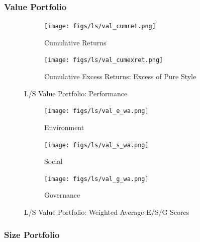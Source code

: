 \documentclass[11pt,a4paper]{article}
\begin{document}
\clearpage

\subsubsection{Value Portfolio}

\begin{figure}[h!]
    \centering
    \begin{subfigure}{.5\textwidth}
        \centering
        \texttt{[image: figs/ls/val\_cumret.png]}
        \caption{Cumulative Returns}
        \label{fig:val_cumret}
    \end{subfigure}%
    \begin{subfigure}{.5\textwidth}
      \centering
      \texttt{[image: figs/ls/val\_cumexret.png]}
      \caption{Cumulative Excess Returns: Excess of Pure Style}
      \label{fig:val_cumexret}
    \end{subfigure}
    \caption{L/S Value Portfolio: Performance}
\end{figure}

\begin{figure}[h!]
    \centering
    \begin{subfigure}{.33\textwidth}
        \centering
        \texttt{[image: figs/ls/val\_e\_wa.png]}
        \caption{Environment}
        \label{fig:val_e_wa}
    \end{subfigure}%
    \begin{subfigure}{.33\textwidth}
      \centering
      \texttt{[image: figs/ls/val\_s\_wa.png]}
      \caption{Social}
      \label{fig:val_s_wa}
    \end{subfigure}%
    \begin{subfigure}{.33\textwidth}
        \centering
        \texttt{[image: figs/ls/val\_g\_wa.png]}
        \caption{Governance}
        \label{fig:val_g_wa}
      \end{subfigure}
    \caption{L/S Value Portfolio: Weighted-Average E/S/G Scores}
\end{figure}

\begin{center}
    
    \label{tab:val_stats}
\end{center}

\clearpage

\subsubsection{Size Portfolio}
\end{document}
